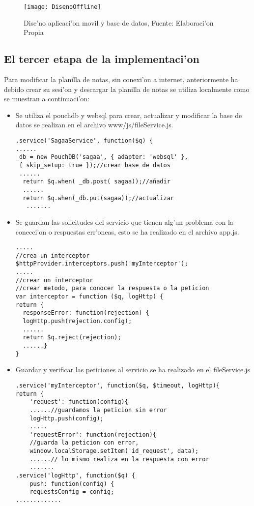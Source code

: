 \begin{figure}[H]
\centering
\texttt{[image: DisenoOffline]}
\captionsetup{justification=centering, margin=2cm}
\caption{Dise'no aplicaci'on movil y base de datos, Fuente: Elaboraci'on Propia}
\label{fig:DO}
\end{figure}

\subsection{El tercer etapa de la implementaci'on}
Para modificar la planilla de notas, sin conexi'on a internet, anteriormente ha debido crear su sesi'on y descargar la planilla de notas se utiliza localmente como se muestran a continuaci'on:
\begin{itemize}
\item Se utiliza el pouchdb y websql para crear, actualizar y modificar la base de datos se realizan en el archivo www/js/fileService.js.
\begin{verbatim}
.service('SagaaService', function($q) {
......
_db = new PouchDB('sagaa', { adapter: 'websql' }, 
 { skip_setup: true });//crear base de datos
 ......
  return $q.when( _db.post( sagaa));//añadir
  ......
  return $q.when(_db.put(sagaa));//actualizar
   .......
\end{verbatim}
\item Se guardan las solicitudes del servicio que tienen alg'un problema con la conecci'on o respuestas err'oneas, esto se ha realizado en el archivo app.js.
\begin{verbatim}
.....
//crea un interceptor
$httpProvider.interceptors.push('myInterceptor');
.....
//crear un interceptor
//crear metodo, para conocer la respuesta o la peticion
var interceptor = function ($q, logHttp) {
return {
  responseError: function(rejection) {
  logHttp.push(rejection.config);
  ......
  return $q.reject(rejection);
  ......}
}
\end{verbatim}
\item Guardar y verificar las peticiones al servicio se ha realizado en el fileService.js  
\begin{verbatim}
.service('myInterceptor', function($q, $timeout, logHttp){
return { 
	'request': function(config){ 
	......//guardamos la peticion sin error
	logHttp.push(config);
	.....
	'requestError': function(rejection){
	//guarda la peticion con error, 
	window.localStorage.setItem('id_request', data);
	......// lo mismo realiza en la respuesta con error
	.......
.service('logHttp', function($q) {
	push: function(config) {
	requestsConfig = config;
.............
\end{verbatim}
\end{itemize}



